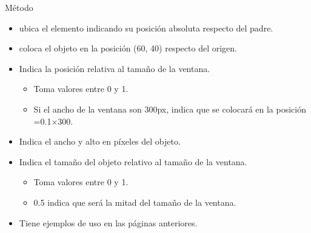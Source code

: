 \documentclass[10pt, envcountsect , spanish]{beamer}
\begin{document}
\begin{frame}{Método }

\begin{itemize} 
\item  {} ubica el elemento indicando su posición absoluta respecto del padre.
\item {} coloca el objeto en la posición (60, 40) respecto del origen.
\item {} Indica la posición relativa al tamaño de la ventana.
	\begin{itemize}
	\item Toma valores entre 0 y 1.
	\item Si el ancho de la ventana son 300px,  indica que se colocará en la posición =0.1$\times$300.
	\end{itemize}
	
\item {} Indica el ancho y alto en píxeles del objeto.
\item {} Indica el tamaño del objeto relativo al tamaño de la ventana. 
	\begin{itemize}
	\item Toma valores entre 0 y 1.
	\item 0.5 indica que será la mitad del tamaño de la ventana.
	\end{itemize}
	
\item Tiene ejemplos de uso en las páginas anteriores.
\end{itemize}

\end{frame}
\end{document}
